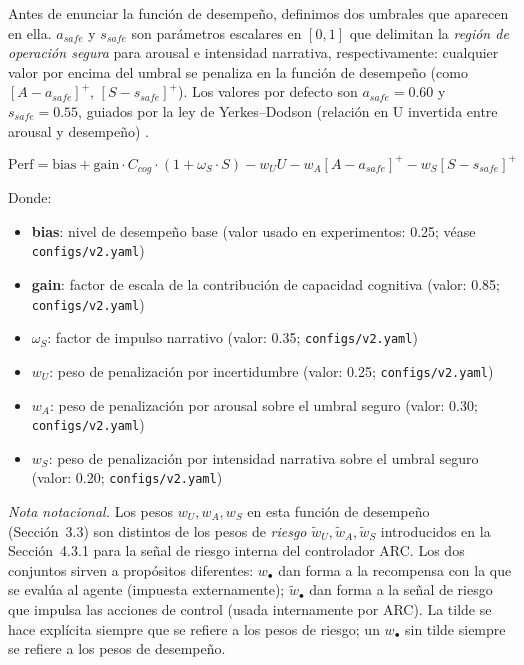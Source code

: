 \documentclass{article}
\begin{document}
Antes de enunciar la función de desempeño, definimos dos umbrales que aparecen en ella. $a_{safe}$ y $s_{safe}$ son parámetros escalares en $[0,1]$ que delimitan la \emph{región de operación segura} para arousal e intensidad narrativa, respectivamente: cualquier valor por encima del umbral se penaliza en la función de desempeño (como $[A-a_{safe}]^+$, $[S-s_{safe}]^+$). Los valores por defecto son $a_{safe}=0.60$ y $s_{safe}=0.55$, guiados por la ley de Yerkes--Dodson (relación en U invertida entre arousal y desempeño) \cite{Yerkes1908,Hebb1955}.

\begin{equation}\label{eq:perf}
\text{Perf} = \text{bias} + \text{gain} \cdot C_{cog} \cdot (1 + \omega_S \cdot S) - w_U U - w_A [A - a_{safe}]^+ - w_S [S - s_{safe}]^+
\end{equation}

Donde:
\begin{itemize}
    \item \textbf{bias}: nivel de desempeño base (valor usado en experimentos: 0.25; véase \texttt{configs/v2.yaml})
    \item \textbf{gain}: factor de escala de la contribución de capacidad cognitiva (valor: 0.85; \texttt{configs/v2.yaml})
    \item \textbf{$\omega_S$}: factor de impulso narrativo (valor: 0.35; \texttt{configs/v2.yaml})
    \item \textbf{$w_U$}: peso de penalización por incertidumbre (valor: 0.25; \texttt{configs/v2.yaml})
    \item \textbf{$w_A$}: peso de penalización por arousal sobre el umbral seguro (valor: 0.30; \texttt{configs/v2.yaml})
    \item \textbf{$w_S$}: peso de penalización por intensidad narrativa sobre el umbral seguro (valor: 0.20; \texttt{configs/v2.yaml})
\end{itemize}

\emph{Nota notacional.} Los pesos $w_U, w_A, w_S$ en esta función de desempeño (Sección~3.3) son distintos de los pesos de \emph{riesgo} $\tilde{w}_U, \tilde{w}_A, \tilde{w}_S$ introducidos en la Sección~4.3.1 para la señal de riesgo interna del controlador ARC. Los dos conjuntos sirven a propósitos diferentes: $w_\bullet$ dan forma a la recompensa con la que se evalúa al agente (impuesta externamente); $\tilde{w}_\bullet$ dan forma a la señal de riesgo que impulsa las acciones de control (usada internamente por ARC). La tilde se hace explícita siempre que se refiere a los pesos de riesgo; un $w_\bullet$ sin tilde siempre se refiere a los pesos de desempeño.
\end{document}
